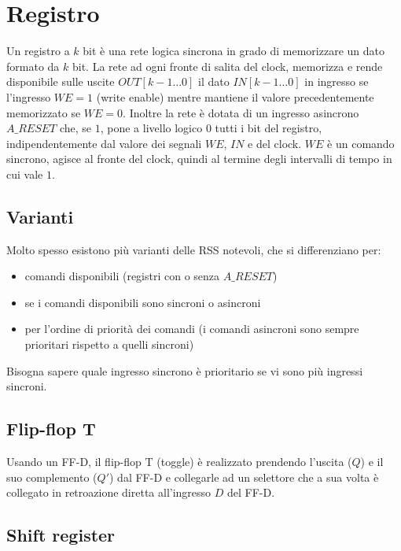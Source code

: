 \documentclass{article}
\begin{document}
\section{Registro}

Un registro a $k$ bit è una rete logica sincrona in grado di memorizzare un dato formato da $k$ bit.
La rete ad ogni fronte di salita del clock, memorizza e rende disponibile sulle uscite $OUT[k-1 \dots 0]$ il dato $IN[k-1 \dots 0]$ in ingresso se l'ingresso $WE = 1$ (write enable) mentre mantiene il valore precedentemente memorizzato se $WE = 0$.
Inoltre la rete è dotata di un ingresso asincrono $A\_RESET$ che, se $1$, pone a livello logico $0$ tutti i bit del registro, indipendentemente dal valore dei segnali $WE$, $IN$ e del clock.
$WE$ è un comando sincrono, agisce al fronte del clock, quindi al termine degli intervalli di tempo in cui vale $1$.

\subsection{Varianti}

Molto spesso esistono più varianti delle RSS notevoli, che si differenziano per:

\begin{itemize}
    \item comandi disponibili (registri con o senza $A\_RESET$)
    \item se i comandi disponibili sono sincroni o asincroni
    \item per l'ordine di priorità dei comandi (i comandi asincroni sono sempre prioritari rispetto a quelli sincroni)
\end{itemize}

\noindent
Bisogna sapere quale ingresso sincrono è prioritario se vi sono più ingressi sincroni.

\subsection{Flip-flop T}

Usando un FF-D, il flip-flop T (toggle) è realizzato prendendo l'uscita ($Q$) e il suo complemento ($Q'$) dal FF-D e collegarle ad un selettore che a sua volta è collegato in retroazione diretta all'ingresso $D$ del FF-D.

\subsection{Shift register}
\end{document}
